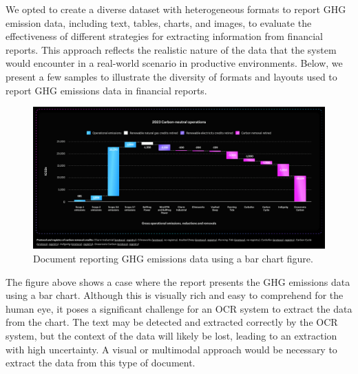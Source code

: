 \documentclass[english, 12pt, a4paper, elec, utf8, a-2b, online]{aaltothesis}
\begin{document}
We opted to create a diverse dataset with heterogeneous formats to report \ac{GHG} emission data, including text, tables, charts, and images, to evaluate the effectiveness of different strategies for extracting information from financial reports.
This approach reflects the realistic nature of the data that the system would encounter in a real-world scenario in productive environments.
Below, we present a few samples to illustrate the diversity of formats and layouts used to report \ac{GHG} emissions data in financial reports.

\begin{figure}[H]
    \centering
    \includegraphics[width=\textwidth]{images/ghg_emissions_bar_chart.png}
    \caption{Document reporting \ac{GHG} emissions data using a bar chart figure.}
    \label{ghg_emissions_bar_chart}
\end{figure}

The figure above shows a case where the report presents the \ac{GHG} emissions data using a bar chart.
Although this is visually rich and easy to comprehend for the human eye, it poses a significant challenge for an \ac{OCR} system to extract the data from the chart.
The text may be detected and extracted correctly by the \ac{OCR} system, but the context of the data will likely be lost, leading to an extraction with high uncertainty.
A visual or multimodal approach would be necessary to extract the data from this type of document.
\end{document}
